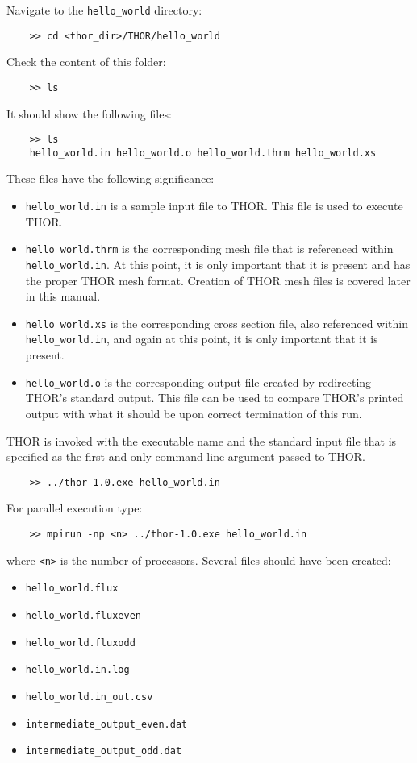 Navigate to the \verb"hello_world" directory:
\begin{verbatim}
    >> cd <thor_dir>/THOR/hello_world
\end{verbatim}
Check the content of this folder:
\begin{verbatim}
    >> ls
\end{verbatim}
It should show the following files:
\begin{verbatim}
    >> ls
    hello_world.in hello_world.o hello_world.thrm hello_world.xs
\end{verbatim}
These files have the following significance:
\begin{itemize}
    \item \verb"hello_world.in" is a sample input file to \ac{THOR}. This file is used to execute \ac{THOR}.
    \item \verb"hello_world.thrm" is the corresponding mesh file that is referenced within \verb"hello_world.in". At this point, it is only important that it is present and has the proper \ac{THOR} mesh format. Creation of \ac{THOR} mesh files is covered later in this manual.
    \item \verb"hello_world.xs" is the corresponding cross section file, also referenced within \verb"hello_world.in", and again at this point, it is only important that it is present.
    \item \verb"hello_world.o" is the corresponding output file created by redirecting \ac{THOR}'s standard output. This file can be used to compare \ac{THOR}'s printed output with what it should be upon correct termination of this run.
\end{itemize}
\ac{THOR} is invoked with the executable name and the standard input file that is specified as the first and only command line argument passed to \ac{THOR}.
\begin{verbatim}
    >> ../thor-1.0.exe hello_world.in
\end{verbatim}
For parallel execution type:
\begin{verbatim}
    >> mpirun -np <n> ../thor-1.0.exe hello_world.in
\end{verbatim}
where \verb"<n>" is the number of processors.
Several files should have been created:
\begin{itemize}
    \item \verb"hello_world.flux"
    \item \verb"hello_world.fluxeven"
    \item \verb"hello_world.fluxodd"
    \item \verb"hello_world.in.log"
    \item \verb"hello_world.in_out.csv"
    \item \verb"intermediate_output_even.dat"
    \item \verb"intermediate_output_odd.dat"
\end{itemize}
